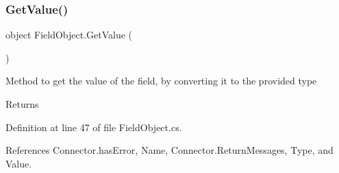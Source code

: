 \subsubsection{\texorpdfstring{Get\+Value()}{GetValue()}}
{\footnotesize\ttfamily object Field\+Object.\+Get\+Value (\begin{DoxyParamCaption}{ }\end{DoxyParamCaption})}



Method to get the value of the field, by converting it to the provided type 

\begin{DoxyReturn}{Returns}

\end{DoxyReturn}


Definition at line 47 of file Field\+Object.\+cs.



References Connector.\+has\+Error, Name, Connector.\+Return\+Messages, Type, and Value.


